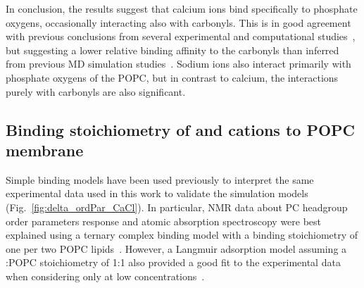\documentclass[aip,jcp,twocolumn]{revtex4}
\begin{document}
In conclusion, the results suggest that calcium ions bind specifically to phosphate oxygens, occasionally interacting also with carbonyls. This is in good agreement with previous conclusions from several experimental and computational studies~\cite{hauser76, hauser78, herbette84, cevc90, binder02}, but suggesting a lower relative binding affinity to the carbonyls than inferred from previous MD simulation studies~\cite{bockmann03, bockmann04, melcrova16, javanainen17}. Sodium ions also interact primarily with phosphate oxygens of the POPC, but in contrast to calcium, the interactions purely with carbonyls are also significant.

\subsection{Binding stoichiometry of  and  cations to POPC membrane}


Simple binding models have been used previously to interpret the same experimental data \cite{altenbach84,macdonald87} used in this work to validate the simulation models (Fig.~\ref{fig:delta_ordPar_CaCl}). In particular, NMR data about PC headgroup order parameters response and atomic absorption spectroscopy were best explained using a ternary complex binding model with a binding stoichiometry of one  per two POPC lipids~\cite{altenbach84}. However, a Langmuir adsorption model assuming a :POPC stoichiometry of 1:1 also provided a good fit to the experimental data when considering only  at low concentrations~\cite{macdonald87}.
\end{document}
